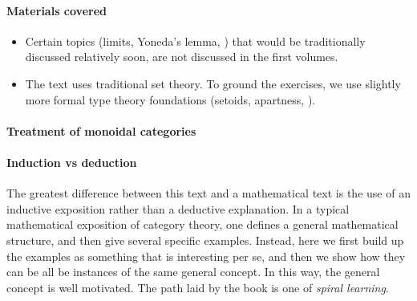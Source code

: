\paragraph{Materials covered}
\begin{itemize}
    \item Certain topics (limits, Yoneda's lemma, \etc) that would be traditionally discussed relatively soon, are not discussed in the first volumes.

    \item The text uses traditional set theory.
          To ground the exercises, we use slightly more formal type theory foundations (setoids, apartness, \etc).

\end{itemize}

\paragraph{Treatment of monoidal categories}


\paragraph{Induction vs deduction}

The greatest difference between this text and a mathematical text is the use of an inductive exposition rather than a deductive explanation.
In a typical mathematical exposition of category theory, one defines a general mathematical structure, and then give several specific examples.
Instead, here we first build up the examples as something that is interesting per se, and then we show how they can be all be instances of the same general concept.
In this way, the general concept is well motivated.
The path laid by the book is one of \emph{spiral learning}.


